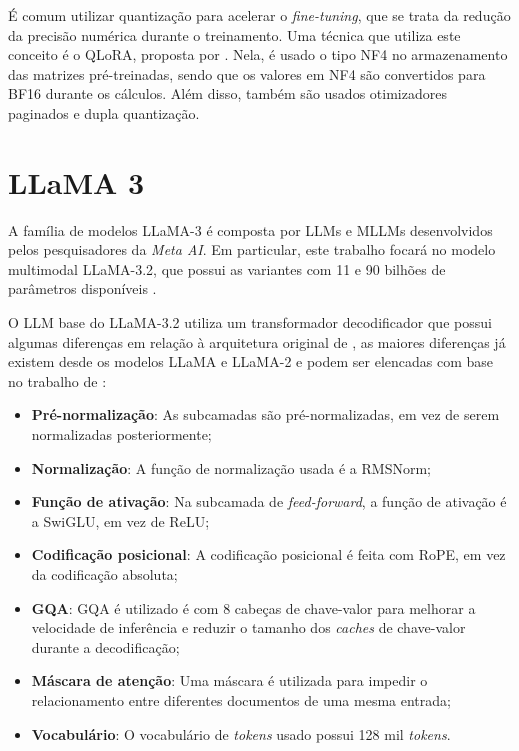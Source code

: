 
É comum utilizar quantização para acelerar o \textit{fine-tuning}, que se trata da redução da precisão numérica durante o treinamento. Uma técnica que utiliza este
conceito é o \ac{QLoRA}, proposta por \textcite{qlora}. Nela, é usado o tipo \ac{NF4} no armazenamento das matrizes pré-treinadas, sendo que os valores em \ac{NF4} são
convertidos para \ac{BF16} durante os cálculos. Além disso, também são usados otimizadores paginados e dupla quantização.

\section{LLaMA 3}

A família de modelos \ac{LLaMA}-3 é composta por \acp{LLM} e \acp{MLLM} desenvolvidos pelos pesquisadores da \textit{Meta AI}. Em particular, este trabalho focará no
modelo multimodal \ac{LLaMA}-3.2, que possui as variantes com 11 e 90 bilhões de parâmetros disponíveis \cite{dubey2024llama}.

O \ac{LLM} base do \ac{LLaMA}-3.2 utiliza um transformador decodificador que possui algumas diferenças em relação à arquitetura original de \textcite{transformer}, as
maiores diferenças já existem desde os modelos \ac{LLaMA} e \ac{LLaMA}-2 e podem ser elencadas com base no trabalho de \textcite{touvron2023llama}:

\begin{itemize}
      \item \textbf{Pré-normalização}: As subcamadas são pré-normalizadas, em vez de serem normalizadas posteriormente;
      \item \textbf{Normalização}: A função de normalização usada é a \ac{RMSNorm};
      \item \textbf{Função de ativação}: Na subcamada de \textit{feed-forward}, a função de ativação é a \ac{SwiGLU}, em vez de \ac{ReLU};
      \item \textbf{Codificação posicional}: A codificação posicional é feita com \ac{RoPE}, em vez da codificação absoluta;
      \item \textbf{\acs{GQA}}: \ac{GQA} é utilizado é com 8 cabeças de chave-valor para melhorar a velocidade de inferência e reduzir o tamanho dos \textit{caches} de
            chave-valor durante a decodificação;
      \item \textbf{Máscara de atenção}: Uma máscara é utilizada para impedir o relacionamento entre diferentes documentos de uma mesma entrada;
      \item \textbf{Vocabulário}: O vocabulário de \textit{tokens} usado possui 128 mil \textit{tokens}.
\end{itemize}

